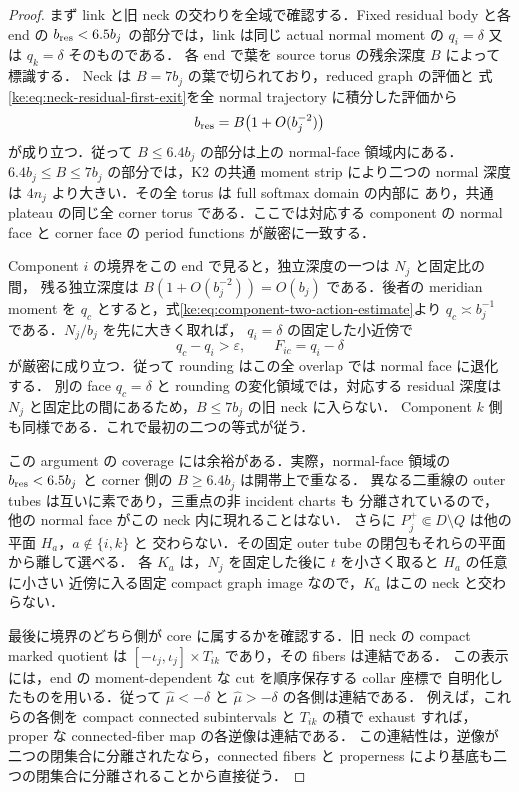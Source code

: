 \begin{proof}
まず link と旧 neck の交わりを全域で確認する．Fixed residual body と各 end の
$b_{\rm res}<6.5b_j$ の部分では，link は同じ actual normal moment の
$q_i=\delta$ 又は $q_k=\delta$ そのものである．
各 end で葉を source torus の残余深度 $B$ によって標識する．
Neck は $B=7b_j$ の葉で切られており，reduced graph の評価と
式\eqref{ke:eq:neck-residual-first-exit}を全 normal trajectory に積分した評価から
\[
 b_{\rm res}=B\bigl(1+O(b_j^{-2})\bigr)
\]
が成り立つ．従って $B\le6.4b_j$ の部分は上の normal-face 領域内にある．
$6.4b_j\le B\le7b_j$ の部分では，K2 の共通 moment strip により二つの
normal 深度は $4n_j$ より大きい．その全 torus は full softmax domain の内部に
あり，共通 plateau の同じ全 corner torus である．ここでは対応する component
の normal face と corner face の period functions が厳密に一致する．

Component $i$ の境界をこの end で見ると，独立深度の一つは $N_j$ と固定比の間，
残る独立深度は $B(1+O(b_j^{-2}))=O(b_j)$ である．後者の meridian moment を
$q_c$ とすると，式\eqref{ke:eq:component-two-action-estimate}より
$q_c\asymp b_j^{-1}$ である．$N_j/b_j$ を先に大きく取れば，
$q_i=\delta$ の固定した小近傍で
\[
 q_c-q_i>\varepsilon,\qquad F_{ic}=q_i-\delta
\]
が厳密に成り立つ．従って rounding はこの全 overlap では normal face に退化する．
別の face $q_c=\delta$ と rounding の変化領域では，対応する residual 深度は
$N_j$ と固定比の間にあるため，$B\le7b_j$ の旧 neck に入らない．
Component $k$ 側も同様である．これで最初の二つの等式が従う．

この argument の coverage には余裕がある．実際，normal-face 領域の
$b_{\rm res}<6.5b_j$ と corner 側の $B\ge6.4b_j$ は開帯上で重なる．
異なる二重線の outer tubes は互いに素であり，三重点の非 incident charts も
分離されているので，他の normal face がこの neck 内に現れることはない．
さらに $P_j^+\Subset D\setminus Q$ は他の平面 $H_a$，$a\notin\{i,k\}$ と
交わらない．その固定 outer tube の閉包もそれらの平面から離して選べる．
各 $K_a$ は，$N_j$ を固定した後に $t$ を小さく取ると $H_a$ の任意に小さい
近傍に入る固定 compact graph image なので，$K_a$ はこの neck と交わらない．

最後に境界のどちら側が core に属するかを確認する．旧 neck の compact marked
quotient は $[-\iota_j,\iota_j]\times T_{ik}$ であり，その fibers は連結である．
この表示には，end の moment-dependent な cut を順序保存する collar 座標で
自明化したものを用いる．従って
$\widehat\mu< -\delta$ と $\widehat\mu> -\delta$ の各側は連結である．
例えば，これらの各側を compact connected subintervals と $T_{ik}$ の積で
exhaust すれば，proper な connected-fiber map の各逆像は連結である．
この連結性は，逆像が二つの閉集合に分離されたなら，connected fibers と
properness により基底も二つの閉集合に分離されることから直接従う．


\end{proof}
